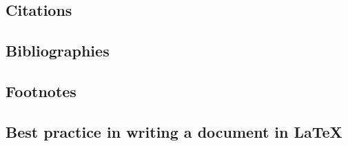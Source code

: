 \subsection{Citations}\label{Sec:Citations}


\subsection{Bibliographies}\label{Sec:Bibliographies}


\subsection{Footnotes}


\subsection{Best practice in writing a document in LaTeX}
